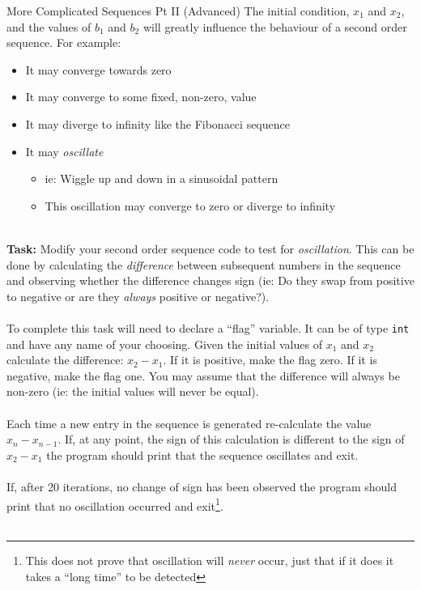 \documentclass{lab}
\begin{document}
\begin{task}{More Complicated Sequences Pt II (Advanced)}{}
The initial condition, $x_1$ and $x_2$, and the values of $b_1$ and $b_2$ will greatly influence the behaviour of a second order sequence. For example:

\begin{itemize}
\item It may converge towards zero
\item It may converge to some fixed, non-zero, value
\item It may diverge to infinity like the Fibonacci sequence
\item It may \textit{oscillate}
	\begin{itemize}
		\item ie: Wiggle up and down in a sinusoidal pattern
		\item This oscillation may converge to zero or diverge to infinity
	\end{itemize}
\end{itemize}
~\\
\textbf{Task: }Modify your second order sequence code to test for \textit{oscillation}. This can be done by calculating the \textit{difference} between subsequent numbers in the sequence and observing whether the difference changes sign (ie: Do they swap from positive to negative or are they \textit{always} positive or negative?).
\\ \\
To complete this task will need to declare a ``flag'' variable. It can be of type \texttt{int} and have any name of your choosing. Given the initial values of $x_1$ and $x_2$ calculate the difference: $x_2 - x_1$. If it is positive, make the flag zero. If it is negative, make the flag one. You may assume that the difference will always be non-zero (ie: the initial values will never be equal).
\\ \\
Each time a new entry in the sequence is generated re-calculate the value $x_n - x_{n-1}$. If, at any point, the sign of this calculation is different to the sign of $x_2 - x_1$ the program should print that the sequence oscillates and exit.
\\ \\
If, after 20 iterations, no change of sign has been observed the program should print that no oscillation occurred and exit\footnote{This does not prove that oscillation will \textit{never} occur, just that if it does it takes a ``long time'' to be detected}.
\\ \\

\end{task}
\end{document}
